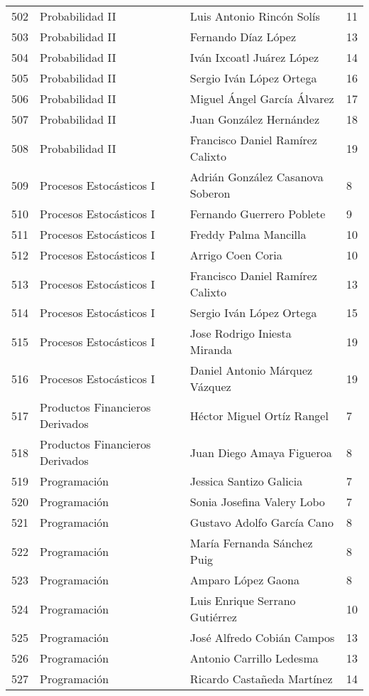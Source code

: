 \begin{table}[ht]
\begin{tabular}{rlll}
  502 & Probabilidad II & Luis Antonio Rincón Solís & 11 \\ 
  503 & Probabilidad II & Fernando Díaz López & 13 \\ 
  504 & Probabilidad II & Iván Ixcoatl Juárez López & 14 \\ 
  505 & Probabilidad II & Sergio Iván López Ortega & 16 \\ 
  506 & Probabilidad II & Miguel Ángel García Álvarez & 17 \\ 
  507 & Probabilidad II & Juan González Hernández & 18 \\ 
  508 & Probabilidad II & Francisco Daniel Ramírez Calixto & 19 \\ 
  509 & Procesos Estocásticos I & Adrián González Casanova Soberon & 8 \\ 
  510 & Procesos Estocásticos I & Fernando Guerrero Poblete & 9 \\ 
  511 & Procesos Estocásticos I & Freddy Palma Mancilla & 10 \\ 
  512 & Procesos Estocásticos I & Arrigo Coen Coria & 10 \\ 
  513 & Procesos Estocásticos I & Francisco Daniel Ramírez Calixto & 13 \\ 
  514 & Procesos Estocásticos I & Sergio Iván López Ortega & 15 \\ 
  515 & Procesos Estocásticos I & Jose Rodrigo Iniesta Miranda & 19 \\ 
  516 & Procesos Estocásticos I & Daniel Antonio Márquez Vázquez & 19 \\ 
  517 & Productos Financieros Derivados & Héctor Miguel Ortíz Rangel & 7 \\ 
  518 & Productos Financieros Derivados & Juan Diego Amaya Figueroa & 8 \\ 
  519 & Programación & Jessica Santizo Galicia & 7 \\ 
  520 & Programación & Sonia Josefina Valery Lobo & 7 \\ 
  521 & Programación & Gustavo Adolfo García Cano & 8 \\ 
  522 & Programación & María Fernanda Sánchez Puig & 8 \\ 
  523 & Programación & Amparo López Gaona & 8 \\ 
  524 & Programación & Luis Enrique Serrano Gutiérrez & 10 \\ 
  525 & Programación & José Alfredo Cobián Campos & 13 \\ 
  526 & Programación & Antonio Carrillo Ledesma & 13 \\ 
  527 & Programación & Ricardo Castañeda Martínez & 14 \\ 

\end{tabular}
\end{table}
